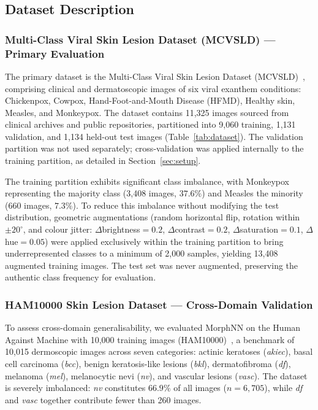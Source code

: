 \documentclass[preprint,12pt]{elsarticle}
\begin{document}
\subsection{Dataset Description}
\label{sec:datasets}

\subsubsection{Multi-Class Viral Skin Lesion Dataset (MCVSLD) ---
               Primary Evaluation}
\label{sec:mcvsld}

The primary dataset is the Multi-Class Viral Skin Lesion Dataset
(MCVSLD)~\cite{mcvsld2023}, comprising clinical and dermatoscopic images
of six viral exanthem conditions: Chickenpox, Cowpox,
Hand-Foot-and-Mouth Disease (HFMD), Healthy skin, Measles, and
Monkeypox.  The dataset contains 11,325 images sourced from clinical
archives and public repositories, partitioned into 9,060 training,
1,131 validation, and 1,134 held-out test images
(Table~\ref{tab:dataset}).  The validation partition was not used
separately; cross-validation was applied internally to the training
partition, as detailed in Section~\ref{sec:setup}.

The training partition exhibits significant class imbalance, with
Monkeypox representing the majority class (3,408 images, $37.6\%$)
and Measles the minority (660 images, $7.3\%$).  To reduce this
imbalance without modifying the test distribution, geometric
augmentations (random horizontal flip, rotation within $\pm 20^\circ$,
and colour jitter: $\Delta$brightness$= 0.2$, $\Delta$contrast$= 0.2$,
$\Delta$saturation$= 0.1$, $\Delta$hue$= 0.05$) were applied
exclusively within the training partition to bring underrepresented
classes to a minimum of 2,000 samples, yielding 13,408 augmented
training images.  The test set was never augmented, preserving the
authentic class frequency for evaluation.

\subsubsection{HAM10000 Skin Lesion Dataset ---
               Cross-Domain Validation}
\label{sec:ham}

To assess cross-domain generalisability, we evaluated MorphNN on the
Human Against Machine with 10,000 training images
(HAM10000)~\cite{tschandl2018ham10000}, a benchmark of 10,015
dermoscopic images across seven categories: actinic keratoses
(\textit{akiec}), basal cell carcinoma (\textit{bcc}), benign
keratosis-like lesions (\textit{bkl}), dermatofibroma (\textit{df}),
melanoma (\textit{mel}), melanocytic nevi (\textit{nv}), and vascular
lesions (\textit{vasc}).  The dataset is severely imbalanced: \textit{nv}
constitutes $66.9\%$ of all images ($n = 6{,}705$), while \textit{df}
and \textit{vasc} together contribute fewer than 260 images.
\end{document}
